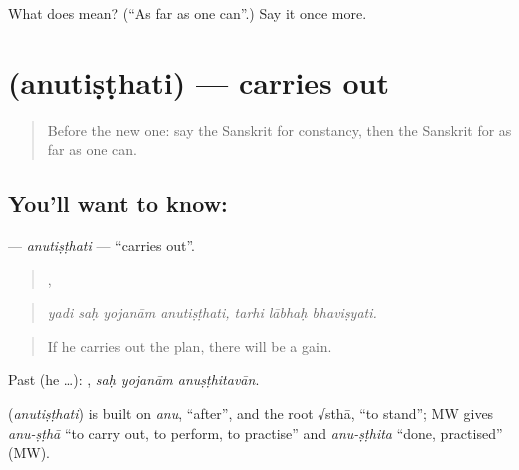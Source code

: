 \begin{tcolorbox}[breakable,colback=teal!4,colframe=teal!35!black,title={Before you move on}]
What does  mean? (\textquotedblleft{}As far as one can\textquotedblright{}.) Say it once more.
\end{tcolorbox}
\section[\texorpdfstring{\sk{अनुतिष्ठति} (anutiṣṭhati)}{अनुतिष्ठति (anutiṣṭhati)}]{ (anutiṣṭhati) — carries out}

\label{lesson:SA-C384-anutisthati}



\begin{quote}
Before the new one: say the Sanskrit for constancy, then the Sanskrit for as far as one can.
\end{quote}

\subsection*{You'll want to know: }
\textbf{} — \emph{anutiṣṭhati} — \textquotedblleft{}carries out\textquotedblright{}.

\begin{quote}
   ,   
\end{quote}

\begin{quote}
\emph{yadi saḥ yojanām anutiṣṭhati, tarhi lābhaḥ bhaviṣyati.}
\end{quote}

\begin{quote}
If he carries out the plan, there will be a gain.
\end{quote}

Past (he …):   , \emph{saḥ yojanām anuṣṭhitavān}.

\begin{cousinweb}
\textbf{} (\emph{anutiṣṭhati}) is built on \emph{anu}, \textquotedblleft{}after\textquotedblright{}, and the root √sthā, \textquotedblleft{}to stand\textquotedblright{}; MW gives \emph{anu-ṣṭhā} \textquotedblleft{}to carry out, to perform, to practise\textquotedblright{} and \emph{anu-ṣṭhita} \textquotedblleft{}done, practised\textquotedblright{} (MW).
\end{cousinweb}

